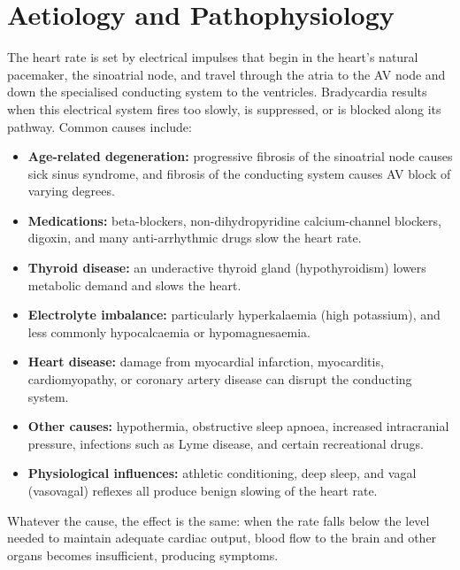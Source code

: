 \section*{Aetiology and Pathophysiology}
The heart rate is set by electrical impulses that begin in the heart's natural pacemaker, the sinoatrial node, and travel through the atria to the AV node and down the specialised conducting system to the ventricles. Bradycardia results when this electrical system fires too slowly, is suppressed, or is blocked along its pathway. Common causes include:
\begin{itemize}
    \item \textbf{Age-related degeneration:} progressive fibrosis of the sinoatrial node causes sick sinus syndrome, and fibrosis of the conducting system causes AV block of varying degrees.
    \item \textbf{Medications:} beta-blockers, non-dihydropyridine calcium-channel blockers, digoxin, and many anti-arrhythmic drugs slow the heart rate.
    \item \textbf{Thyroid disease:} an underactive thyroid gland (hypothyroidism) lowers metabolic demand and slows the heart.
    \item \textbf{Electrolyte imbalance:} particularly hyperkalaemia (high potassium), and less commonly hypocalcaemia or hypomagnesaemia.
    \item \textbf{Heart disease:} damage from myocardial infarction, myocarditis, cardiomyopathy, or coronary artery disease can disrupt the conducting system.
    \item \textbf{Other causes:} hypothermia, obstructive sleep apnoea, increased intracranial pressure, infections such as Lyme disease, and certain recreational drugs.
    \item \textbf{Physiological influences:} athletic conditioning, deep sleep, and vagal (vasovagal) reflexes all produce benign slowing of the heart rate.
\end{itemize}
Whatever the cause, the effect is the same: when the rate falls below the level needed to maintain adequate cardiac output, blood flow to the brain and other organs becomes insufficient, producing symptoms.

